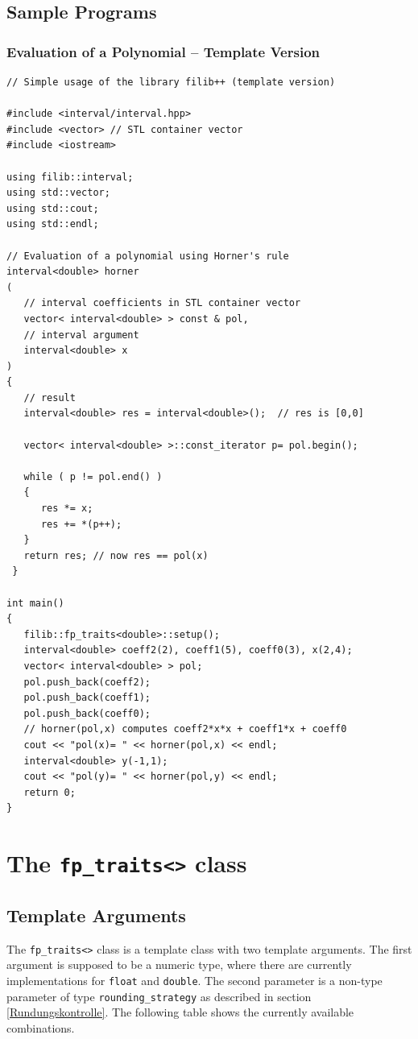 \documentclass{report}
\begin{document}
\section{Sample Programs}
	
		\subsection{Evaluation of a Polynomial -- Template Version}
\begin{verbatim}
// Simple usage of the library filib++ (template version)
 
#include <interval/interval.hpp>
#include <vector> // STL container vector
#include <iostream>

using filib::interval;
using std::vector;
using std::cout;
using std::endl;

// Evaluation of a polynomial using Horner's rule 
interval<double> horner
(
   // interval coefficients in STL container vector 
   vector< interval<double> > const & pol, 
   // interval argument   
   interval<double> x 
)
{
   // result 
   interval<double> res = interval<double>();  // res is [0,0]

   vector< interval<double> >::const_iterator p= pol.begin();

   while ( p != pol.end() )
   {
      res *= x; 
      res += *(p++);
   }
   return res; // now res == pol(x)
 }

int main()
{
   filib::fp_traits<double>::setup();
   interval<double> coeff2(2), coeff1(5), coeff0(3), x(2,4);
   vector< interval<double> > pol; 
   pol.push_back(coeff2); 
   pol.push_back(coeff1);
   pol.push_back(coeff0);
   // horner(pol,x) computes coeff2*x*x + coeff1*x + coeff0
   cout << "pol(x)= " << horner(pol,x) << endl;
   interval<double> y(-1,1); 
   cout << "pol(y)= " << horner(pol,y) << endl;
   return 0;
}
\end{verbatim}

	\chapter{The \texttt{fp\_traits<>} class}
	\section{Template Arguments}
	The \texttt{fp\_traits<>} class is a template class with
	two template arguments. The first argument is supposed
	to be a numeric type, where there are currently implementations
	for \texttt{float} and \texttt{double}. The second parameter
	is a non-type parameter of type \texttt{rounding\_strategy}
	as described in section \ref{Rundungskontrolle}. The following table
	shows the  currently available combinations.
\end{document}
